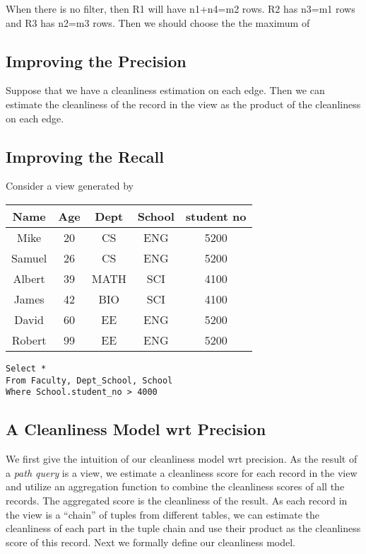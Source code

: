When there is no filter, then R1 will have n1+n4=m2 rows. R2 has n3=m1 rows and R3 has n2=m3 rows. Then we should choose the the maximum of 

\subsection{Improving the Precision}
Suppose that we have a cleanliness estimation on each edge. Then we can estimate the cleanliness of the record in the view as the product of the cleanliness on each edge.

\subsection{Improving the Recall}
Consider a view generated by 

\begin{table}
\centering
\begin{tabular}{|c|c|c|c|c|} \hline
Name & Age & Dept & School & student no \\\hline
Mike & 20  & CS   & ENG &  5200 \\\hline
Samuel & 26  & CS   & ENG &  5200 \\\hline
Albert & 39  & MATH & SCI &  4100 \\\hline
James  & 42  & BIO  & SCI &  4100 \\\hline
David  & 60  & EE   & ENG &  5200 \\\hline
Robert & 99  & EE   & ENG &  5200 \\\hline
\end{tabular}
\end{table}

\lstset{language=SQL}
\begin{lstlisting}
Select *
From Faculty, Dept_School, School
Where School.student_no > 4000
\end{lstlisting}





\subsection{A Cleanliness Model wrt Precision}\label{subsec:model:precision}


We first give the intuition of our cleanliness model wrt precision. As the result of a \emph{path query} is a view, we estimate a cleanliness score for each record in the view and utilize an aggregation function to combine the cleanliness scores of all the records. The aggregated score is the cleanliness of the result. As each record in the view is a ``chain'' of tuples from different tables, we can estimate the cleanliness of each part in the tuple chain and use their product as the cleanliness score of this record. Next we formally define our cleanliness model.


